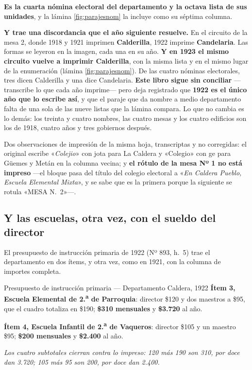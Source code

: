 \begin{cautela}
\textbf{Es la cuarta nómina electoral del departamento y la octava lista de sus unidades}, y la
lámina \ref{fig:parajesnom} la incluye como su séptima columna.

\textbf{Y trae una discordancia que el año siguiente resuelve.} En el circuito de la mesa
2, donde 1918 y 1921 imprimen \textbf{Calderilla}, 1922 imprime \textbf{Candelaria}. Las formas se
leyeron en la imagen, cada una en su año. \textbf{Y en 1923 el mismo circuito vuelve a imprimir
Calderilla}, con la misma lista y en el mismo lugar de la enumeración (lámina
\ref{fig:parajesnom}). De las cuatro nóminas electorales, tres dicen Calderilla y una dice
Candelaria. \textbf{Este libro sigue sin conciliar} ---transcribe lo que cada año imprime--- pero
deja registrado que \textbf{1922 es el único año que lo escribe así}, y que el paraje que da
nombre a medio departamento falta de una sola de las nueve listas que la lámina compara. Lo
que no cambia es lo demás: los treinta y cuatro nombres, las cuatro mesas y los cuatro edificios
son los de 1918, cuatro años y tres gobiernos después.

Dos observaciones de impresión de la misma hoja, transcriptas y no corregidas: el original
escribe «\textit{Colejio}» con jota para La Caldera y «Colegio» con ge para Güemes y Metán en la
columna vecina; y \textbf{el rótulo de la mesa Nº 1 no está impreso} ---el bloque pasa del título
del colegio electoral a «\textit{En Caldera Pueblo, Escuela Elemental Mixta}», y se sabe que es
la primera porque la siguiente se rotula «MESA N.\ 2»---.
\end{cautela}

\subsection*{Y las escuelas, otra vez, con el sueldo del director}

El presupuesto de instrucción primaria de 1922 (Nº 893, h.\ 5) trae el departamento en dos
ítems, y otra vez, como en 1921, con la columna de importes completa.

\begin{ficha}{Presupuesto de instrucción primaria --- Departamento Caldera, 1922}
\textbf{Ítem 3, Escuela Elemental de 2.\textsuperscript{a} de Parroquia}: director \$120 y dos
maestros a \$95, que el cuadro totaliza en \$190; \textbf{\$310 mensuales} y \textbf{\$3.720}
al año.

\textbf{Ítem 4, Escuela Infantil de 2.\textsuperscript{a} de Vaqueros}: director \$105 y un
maestro \$95; \textbf{\$200 mensuales} y \textbf{\$2.400} al año.

\textit{Los cuatro subtotales cierran contra lo impreso: 120 más 190 son 310, por doce dan 3.720;
105 más 95 son 200, por doce dan 2.400.}
\end{ficha}


